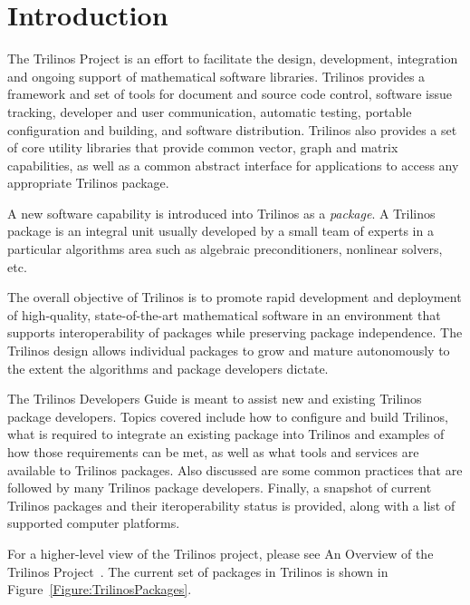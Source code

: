 \documentclass[12pt,relax]{TrilinosDevGuide}
\begin{document}
\section{Introduction}
\label{Section:Introduction}
The Trilinos Project is an effort to facilitate the design, development,
integration and ongoing support of mathematical software libraries.  Trilinos 
provides a framework and set of tools for document and source code control,
software issue tracking, developer and user communication, automatic
testing, portable configuration and building, and software
distribution.  Trilinos also provides a set of core utility libraries
that provide common vector, graph and matrix capabilities, as well as
a common abstract interface for applications to access any appropriate
Trilinos package.

A new software capability is introduced into Trilinos as a {\it
package}.  A Trilinos package is an integral unit usually developed by
a small team of experts in a particular algorithms area such as
algebraic preconditioners, nonlinear solvers, etc.

The overall objective of Trilinos is to promote rapid development and
deployment of high-quality, state-of-the-art mathematical software in
an environment that supports interoperability of packages while
preserving package independence.  The Trilinos design allows 
individual packages to grow and mature autonomously to the extent the 
algorithms and package developers dictate. 

The Trilinos Developers Guide is meant to assist new and existing
Trilinos package developers.  Topics covered include how to configure and 
build Trilinos, what is required to integrate an existing package into Trilinos
and examples of how those requirements can be met, as well as what
tools and services are 
available to Trilinos packages.  Also discussed are some common practices that 
are followed by many Trilinos package developers.  Finally, a snapshot
of current Trilinos packages and their iteroperability status
is provided, along with a list of supported computer platforms.

For a higher-level view of the Trilinos project, please see An Overview
of the Trilinos Project~\cite{TrilinosOverview}. The current set of
packages in Trilinos is shown in Figure~\ref{Figure:TrilinosPackages}.
\end{document}
